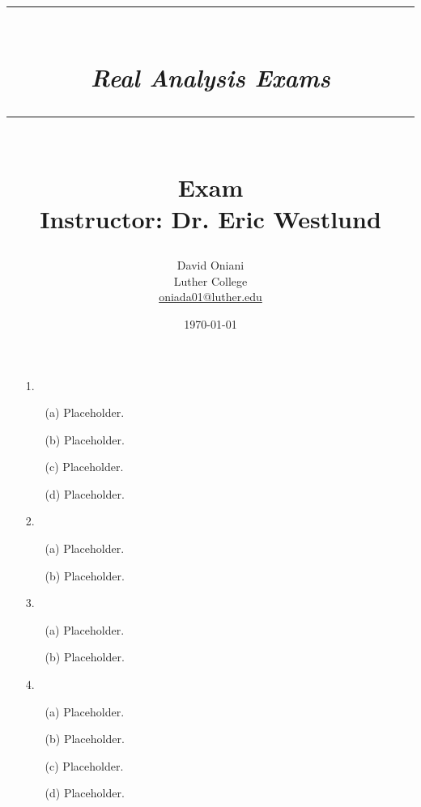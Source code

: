 \documentclass[11pt]{article}
\author{David Oniani\\
        Luther College\\
        \href{mailto:oniada01@luther.edu}{oniada01@luther.edu}}
\title{\rule{\paperwidth - 150pt}{1pt}\textbf{\\\textit{Real Analysis
Exams}\\}\rule {\paperwidth - 150pt}{1pt}\\\textbf{Exam
\textnumero3}\\{\normalsize Instructor: Dr. Eric Westlund}}
\date{\today}
\begin{document}
\maketitle


\begin{itemize}
    \item[1.]
        \begin{itemize}
            \item[(a)]
                Placeholder.

            \item[(b)]
                Placeholder.

            \item[(c)]
                Placeholder.

            \item[(d)]
                Placeholder.
        \end{itemize}

    \item[2.]
        \begin{itemize}
            \item[(a)]
                Placeholder.

            \item[(b)]
                Placeholder.
        \end{itemize}

    \item[3.]
        \begin{itemize}
            \item[(a)]
                Placeholder.

            \item[(b)]
                Placeholder.
        \end{itemize}

    \item[4.]
        \begin{itemize}
            \item[(a)]
                Placeholder.

            \item[(b)]
                Placeholder.

            \item[(c)]
                Placeholder.

            \item[(d)]
                Placeholder.


\end{itemize}
\end{itemize}
\end{document}
